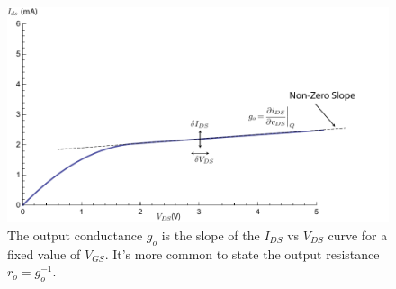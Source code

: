 \newpage
\begin{figure}[t]
\centering
\includegraphics[width=\columnwidth]{ids_idsat_ro}
\caption{The output conductance $g_o$ is the slope of the $I_{DS}$ vs $V_{DS}$ curve for a fixed value of $V_{GS}$.  It's more common to state the output resistance $r_o = g_o^{-1}$.}
\label{fig:ids_idsat_ro}
\end{figure}
